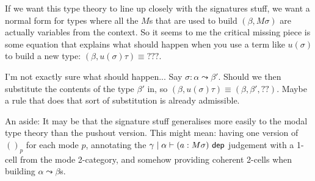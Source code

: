 \documentclass[10pt]{article}
\newcommand{\yields}{\vdash}
\begin{document}
If we want this type theory to line up closely with the signatures stuff, we want a normal form for types where all the $M$s that are used to build $(\beta, M\sigma)$ are actually variables from the context. So it seems to me the critical missing piece is some equation that explains what should happen when you use a term like $u(\sigma)$ to build a new type: $(\beta, u(\sigma)\tau) \equiv \text{???}$. 

I'm not exactly sure what should happen... Say $\sigma : \alpha \leadsto \beta'$. Should we then substitute the contents of the type $\beta'$ in, so $(\beta, u(\sigma)\tau) \equiv (\beta, \beta', \text{??})$. Maybe a rule that does that sort of substitution is already admissible.

An aside: It may be that the signature stuff generalises more easily to the modal type theory than the pushout version. This might mean: having one version of $()_p$ for each mode $p$, annotating the $\gamma \mid \alpha \yields (a : M\sigma) \dep$ judgement with a 1-cell from the mode 2-category, and somehow providing coherent 2-cells when building $\alpha \leadsto \beta$s.
\end{document}
